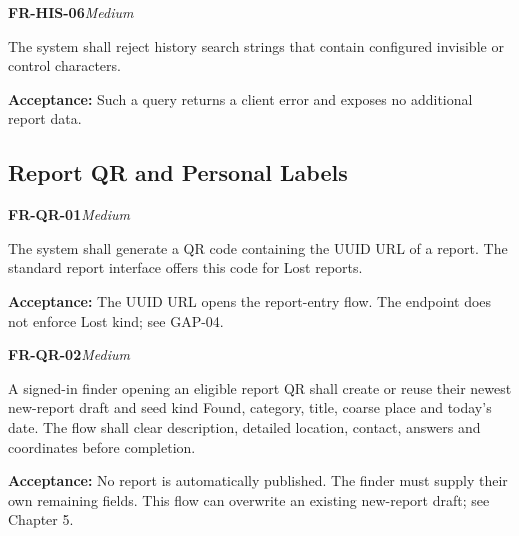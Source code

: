 \documentclass[12pt,a4paper,oneside]{report}
\begin{document}
\noindent\begin{minipage}{\linewidth}\textbf{FR-HIS-06}\hfill\textit{Medium}\par\nopagebreak

The system shall reject history search strings that contain configured invisible or control characters.

{\color{muted}\textbf{Acceptance:} Such a query returns a client error and exposes no additional report data.\par}\end{minipage}\par\vspace{5pt}


\subsection{Report QR and Personal Labels}

\noindent\begin{minipage}{\linewidth}\textbf{FR-QR-01}\hfill\textit{Medium}\par\nopagebreak

The system shall generate a QR code containing the UUID URL of a report. The standard report interface offers this code for Lost reports.

{\color{muted}\textbf{Acceptance:} The UUID URL opens the report-entry flow. The endpoint does not enforce Lost kind; see GAP-04.\par}\end{minipage}\par\vspace{5pt}

\noindent\begin{minipage}{\linewidth}\textbf{FR-QR-02}\hfill\textit{Medium}\par\nopagebreak

A signed-in finder opening an eligible report QR shall create or reuse their newest new-report draft and seed kind Found, category, title, coarse place and today's date. The flow shall clear description, detailed location, contact, answers and coordinates before completion.

{\color{muted}\textbf{Acceptance:} No report is automatically published. The finder must supply their own remaining fields. This flow can overwrite an existing new-report draft; see Chapter 5.\par}\end{minipage}\par\vspace{5pt}
\end{document}
